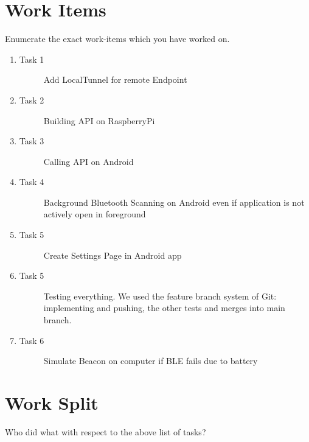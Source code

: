 \documentclass[
10pt, %
a4paper, %
oneside, %
headinclude,footinclude, %
BCOR5mm, %
]{scrartcl}
\begin{document}
\section{Work Items}
Enumerate the exact work-items which you have worked on. 
\begin{enumerate}
\item 
	\begin{description}
	\item[Task 1] Add LocalTunnel for remote Endpoint
	\end{description}
	\item 
	\begin{description}
		\item[Task 2] Building API on RaspberryPi
	\end{description}
	\item 
	\begin{description}
		\item[Task 3] Calling API on Android
	\end{description}
	\item 
	\begin{description}
		\item[Task 4] Background Bluetooth Scanning on Android even if application is not actively open in foreground
	\end{description}
	\item 
	\begin{description}
		\item[Task 5] Create Settings Page in Android app
	\end{description}
	\item 
	\begin{description}
		\item[Task 5] Testing everything. We used the feature branch system of Git: implementing and pushing, the other tests and merges into main branch.
	\end{description}
	\item 
	\begin{description}
		\item[Task 6] Simulate Beacon on computer if BLE fails due to battery 
	\end{description}
\end{enumerate}

\section{Work Split}
Who did what with respect to the above list of tasks?
\end{document}
